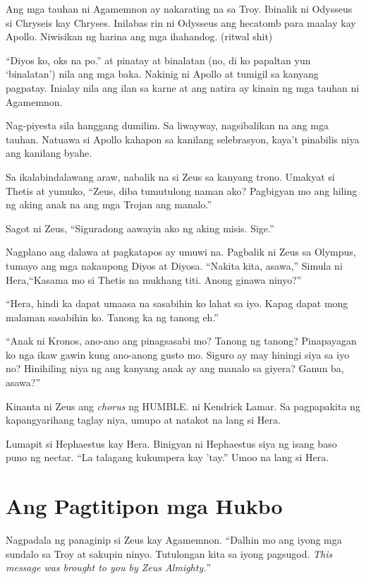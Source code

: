 \documentclass[12pt,letterpaper]{report}
\begin{document}
Ang mga tauhan ni Agamemnon ay nakarating na sa Troy. Ibinalik ni Odysseus si Chryseis kay Chryses. Inilabas rin ni Odysseus ang hecatomb para maalay kay Apollo. Niwisikan ng harina ang mga ihahandog. (ritwal shit)

``Diyos ko, oks na po.'' at pinatay at binalatan (no, di ko papaltan yun `binalatan') nila ang mga baka. Nakinig ni Apollo at tumigil sa kanyang pagpatay. Inialay nila ang ilan sa karne at ang natira ay kinain ng mga tauhan ni Agamemnon.

Nag-piyesta sila hanggang dumilim. Sa liwayway, nagsibalikan na ang mga tauhan. Natuawa si Apollo kahapon sa kanilang selebrasyon, kaya't pinabilis niya ang kanilang byahe.

Sa ikalabindalawang araw, nabalik na si Zeus sa kanyang trono. Umakyat si Thetis at yumuko, ``Zeus, diba tumutulong naman ako? Pagbigyan mo ang hiling ng aking anak na ang mga Trojan ang manalo.''

Sagot ni Zeus, ``Siguradong aawayin ako ng aking misis. Sige.''

Nagplano ang dalawa at pagkatapos ay umuwi na. Pagbalik ni Zeus sa Olympus, tumayo ang mga nakaupong Diyos at Diyosa. ``Nakita kita, asawa,'' Simula ni Hera,``Kasama mo si Thetis na mukhang titi. Anong ginawa ninyo?''

``Hera, hindi ka dapat umaasa na sasabihin ko lahat sa iyo. Kapag dapat mong malaman sasabihin ko. Tanong ka ng tanong eh.''

``Anak ni Kronos, ano-ano ang pinagsasabi mo? Tanong ng tanong? Pinapayagan ko nga ikaw gawin kung ano-anong gusto mo. Siguro ay may hiningi siya sa iyo no? Hinihiling niya ng ang kanyang anak ay ang manalo sa giyera? Ganun ba, asawa?''

Kinanta ni Zeus ang \textit{chorus} ng HUMBLE. ni Kendrick Lamar. Sa pagpapakita ng kapangyarihang taglay niya, umupo at natakot na lang si Hera.

Lumapit si Hephaestus kay Hera. Binigyan ni Hephaestus siya ng isang baso puno ng nectar. ``La talagang kukumpera kay 'tay.'' Umoo na lang si Hera.

\pagebreak
\chapter{Ang Pagtitipon mga Hukbo}

Nagpadala ng panaginip si Zeus kay Agamemnon. ``Dalhin mo ang iyong mga sundalo sa Troy at sakupin ninyo. Tutulongan kita sa iyong pagsugod. \textit{This message was brought to you by Zeus Almighty.}''
\end{document}

